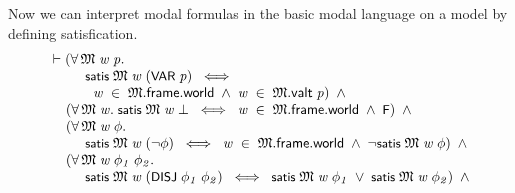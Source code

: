 \documentclass[letterpaper]{article}
\renewcommand{\HOLConst}[1]{{\textsf{\upshape\small #1}}}
\newenvironment{holmath}{\begin{displaymath}\begin{array}{l}}{\end{array}\end{displaymath}\ignorespacesafterend}
\begin{document}
Now we can interpret modal formulas in the basic modal language on a model by defining satisfication.
\begin{holmath}
  \ensuremath{\HOLTokenTurnstile}(\HOLSymConst{\HOLTokenForall{}}\HOLBoundVar{\ensuremath{\mathfrak{M}}}\;\HOLBoundVar{w}\;\HOLBoundVar{p}.\\
\;\;\;\;\;\;\;\;\;\;\HOLConst{satis}\;\HOLBoundVar{\ensuremath{\mathfrak{M}}}\;\HOLBoundVar{w}\;(\HOLConst{VAR}\;\HOLBoundVar{p})\;\HOLSymConst{\HOLTokenEquiv{}}\\
\;\;\;\;\;\;\;\;\;\;\;\;\HOLBoundVar{w}\;\HOLSymConst{\HOLTokenIn{}}\;\HOLBoundVar{\ensuremath{\mathfrak{M}}}.\HOLFieldName{frame}.\HOLFieldName{world}\;\HOLSymConst{\HOLTokenConj{}}\;\HOLBoundVar{w}\;\HOLSymConst{\HOLTokenIn{}}\;\HOLBoundVar{\ensuremath{\mathfrak{M}}}.\HOLFieldName{valt}\;\HOLBoundVar{p})\;\HOLSymConst{\HOLTokenConj{}}\\
\;\;\;\;\;(\HOLSymConst{\HOLTokenForall{}}\HOLBoundVar{\ensuremath{\mathfrak{M}}}\;\HOLBoundVar{w}.\;\HOLConst{satis}\;\HOLBoundVar{\ensuremath{\mathfrak{M}}}\;\HOLBoundVar{w}\;\HOLSymConst{\ensuremath{\bot}}\;\HOLSymConst{\HOLTokenEquiv{}}\;\HOLBoundVar{w}\;\HOLSymConst{\HOLTokenIn{}}\;\HOLBoundVar{\ensuremath{\mathfrak{M}}}.\HOLFieldName{frame}.\HOLFieldName{world}\;\HOLSymConst{\HOLTokenConj{}}\;\HOLConst{F})\;\HOLSymConst{\HOLTokenConj{}}\\
\;\;\;\;\;(\HOLSymConst{\HOLTokenForall{}}\HOLBoundVar{\ensuremath{\mathfrak{M}}}\;\HOLBoundVar{w}\;\HOLBoundVar{\ensuremath{\phi}}.\\
\;\;\;\;\;\;\;\;\;\;\HOLConst{satis}\;\HOLBoundVar{\ensuremath{\mathfrak{M}}}\;\HOLBoundVar{w}\;(\HOLSymConst{\HOLTokenNeg{}}\HOLBoundVar{\ensuremath{\phi}})\;\HOLSymConst{\HOLTokenEquiv{}}\;\HOLBoundVar{w}\;\HOLSymConst{\HOLTokenIn{}}\;\HOLBoundVar{\ensuremath{\mathfrak{M}}}.\HOLFieldName{frame}.\HOLFieldName{world}\;\HOLSymConst{\HOLTokenConj{}}\;\HOLSymConst{\HOLTokenNeg{}}\HOLConst{satis}\;\HOLBoundVar{\ensuremath{\mathfrak{M}}}\;\HOLBoundVar{w}\;\HOLBoundVar{\ensuremath{\phi}})\;\HOLSymConst{\HOLTokenConj{}}\\
\;\;\;\;\;(\HOLSymConst{\HOLTokenForall{}}\HOLBoundVar{\ensuremath{\mathfrak{M}}}\;\HOLBoundVar{w}\;\HOLBoundVar{\ensuremath{\phi\sb{1}}}\;\HOLBoundVar{\ensuremath{\phi\sb{2}}}.\\
\;\;\;\;\;\;\;\;\;\;\HOLConst{satis}\;\HOLBoundVar{\ensuremath{\mathfrak{M}}}\;\HOLBoundVar{w}\;(\HOLConst{DISJ}\;\HOLBoundVar{\ensuremath{\phi\sb{1}}}\;\HOLBoundVar{\ensuremath{\phi\sb{2}}})\;\HOLSymConst{\HOLTokenEquiv{}}\;\HOLConst{satis}\;\HOLBoundVar{\ensuremath{\mathfrak{M}}}\;\HOLBoundVar{w}\;\HOLBoundVar{\ensuremath{\phi\sb{1}}}\;\HOLSymConst{\HOLTokenDisj{}}\;\HOLConst{satis}\;\HOLBoundVar{\ensuremath{\mathfrak{M}}}\;\HOLBoundVar{w}\;\HOLBoundVar{\ensuremath{\phi\sb{2}}})\;\HOLSymConst{\HOLTokenConj{}}\\

\end{holmath}
\end{document}
